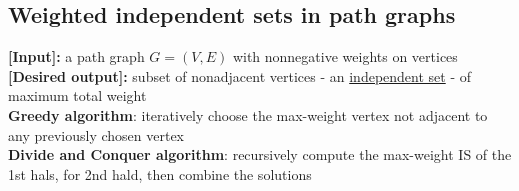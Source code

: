 \documentclass[a4paper,12pt]{article}
\theoremstyle{plain}
\theoremstyle{definition}
\theoremstyle{remark}
\begin{document}
\subsection{Weighted independent sets in path graphs}
\textbf{[Input]:} a path graph $G = (V, E)$ with nonnegative weights on vertices
\\

\textbf{[Desired output]:} subset of nonadjacent vertices - an \underline{independent set} - of maximum total weight
\\

\textbf{Greedy algorithm}: iteratively choose the max-weight vertex not adjacent to any previously chosen vertex
\\

\textbf{Divide and Conquer algorithm}: recursively compute the max-weight IS of the 1st hals, for 2nd hald, then combine the solutions
\end{document}
